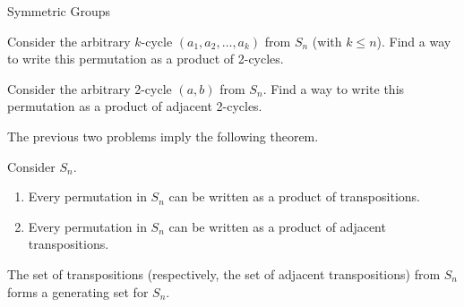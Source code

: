 \begin{section}{Symmetric Groups}
\begin{problem}
Consider the arbitrary $k$-cycle $(a_1,a_2,\ldots, a_k)$ from $S_n$ (with $k\leq n$).  Find a way to write this permutation as a product of 2-cycles. 
\end{problem}

\begin{problem}
Consider the arbitrary 2-cycle $(a,b)$ from $S_n$.  Find a way to write this permutation as a product of adjacent 2-cycles.
\end{problem}

The previous two problems imply the following theorem.

\begin{theorem}
Consider $S_n$.
\begin{enumerate}[label=\textrm{(\alph*)}]
\item Every permutation in $S_n$ can be written as a product of transpositions.
\item Every permutation in $S_n$ can be written as a product of adjacent transpositions.
\end{enumerate}
\end{theorem}

\begin{corollary}
The set of transpositions (respectively, the set of adjacent transpositions) from $S_n$ forms a generating set for $S_n$.
\end{corollary}


\end{section}
